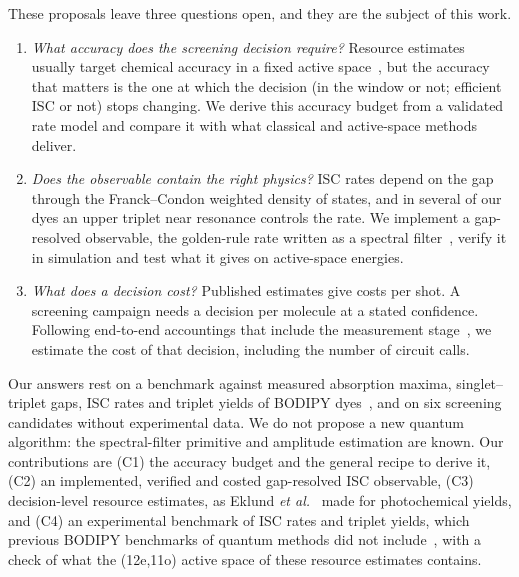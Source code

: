 \documentclass[journal=jctcce,manuscript=article,layout=twocolumn]{achemso}
\begin{document}
These proposals leave three questions open, and they are the subject of this work.
\begin{enumerate}
  \item \emph{What accuracy does the screening decision require?} Resource estimates usually target
        chemical accuracy in a fixed active space~\cite{Reiher2017,vonBurg2021,Lee2021,Goings2022,Caesura2025},
        but the accuracy that matters is the one at which the decision (in the window or not; efficient
        ISC or not) stops changing. We derive this accuracy budget from a validated rate model and
        compare it with what classical and active-space methods deliver.
  \item \emph{Does the observable contain the right physics?} ISC rates depend on the gap through the
        Franck--Condon weighted density of states, and in several of our dyes an upper triplet near
        resonance controls the rate. We implement a gap-resolved observable, the golden-rule rate written as a
        spectral filter~\cite{Roggero2020,Rall2020}, verify it in simulation and test what it gives on
        active-space energies.
  \item \emph{What does a decision cost?} Published estimates give costs per shot. A screening
        campaign needs a decision per molecule at a stated confidence. Following end-to-end accountings
        that include the measurement stage~\cite{KnillOrtizSomma2007,Steudtner2023,Eklund2026}, we estimate
        the cost of that decision, including the number of circuit calls.
\end{enumerate}

Our answers rest on a benchmark against measured absorption maxima, singlet--triplet gaps, ISC rates
and triplet yields of BODIPY dyes~\cite{Ly2021}, and on six screening candidates without experimental
data. We do not propose a new quantum algorithm: the spectral-filter primitive and amplitude estimation
are known. Our contributions are (C1) the accuracy budget and the general recipe to derive it, (C2) an
implemented, verified and costed gap-resolved ISC observable, (C3) decision-level resource estimates,
as Eklund \emph{et al.}~\cite{Eklund2026} made for photochemical yields, and (C4) an experimental
benchmark of ISC rates and triplet yields, which previous BODIPY benchmarks of quantum methods did not
include~\cite{Nykanen2024,Genin2025}, with a check of what the (12e,11o) active space of these resource
estimates contains.

\end{document}
